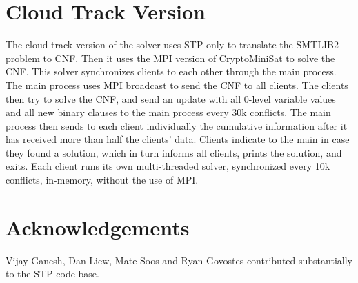 \documentclass{easychair}
\begin{document}
	\section{Cloud Track Version}
	The cloud track version of the solver uses STP only to translate the SMTLIB2 problem to CNF. Then it uses the MPI version of CryptoMiniSat to solve the CNF. This solver synchronizes clients to each other through the main process. The main process uses MPI broadcast to send the CNF to all clients. The clients then try to solve the CNF, and send an update with all 0-level variable values and all new binary clauses to the main process every 30k conflicts. The main process then sends to each client individually the cumulative information after it has received more than half the clients' data. Clients indicate to the main in case they found a solution, which in turn informs all clients, prints the solution, and exits. Each client runs its own multi-threaded solver, synchronized every 10k conflicts, in-memory, without the use of MPI.
\fi


\section*{Acknowledgements}
Vijay Ganesh, Dan Liew, Mate Soos and Ryan Govostes contributed substantially to the STP code base.




\vfill
\pagebreak
\end{document}
